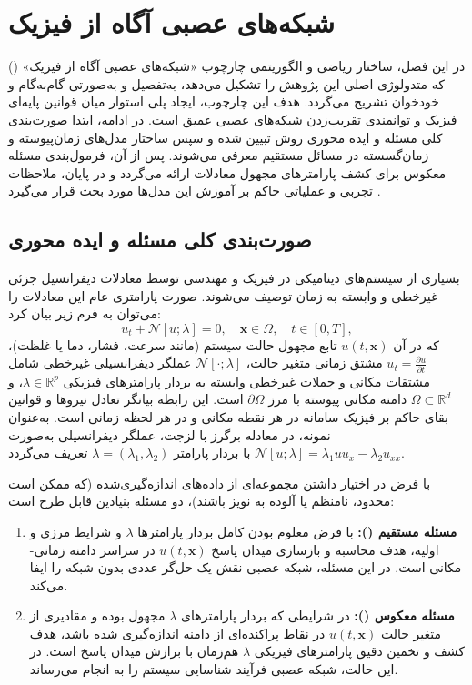 \chapter{شبکه‌های عصبی آگاه از فیزیک}
\label{ch:method}

در این فصل، ساختار ریاضی و الگوریتمی چارچوب «شبکه‌های عصبی آگاه از فیزیک» () که متدولوژی اصلی این پژوهش را تشکیل می‌دهد، به‌تفصیل و به‌صورتی گام‌به‌گام و خودخوان تشریح می‌گردد. هدف این چارچوب، ایجاد پلی استوار میان قوانین پایه‌ای فیزیک و توانمندی تقریب‌زدن شبکه‌های عصبی عمیق است. در ادامه، ابتدا صورت‌بندی کلی مسئله و ایده محوری روش تبیین شده و سپس ساختار مدل‌های زمان‌پیوسته و زمان‌گسسته در مسائل مستقیم معرفی می‌شوند. پس از آن، فرمول‌بندی مسئله معکوس برای کشف پارامترهای مجهول معادلات ارائه می‌گردد و در پایان، ملاحظات تجربی و عملیاتی حاکم بر آموزش این مدل‌ها مورد بحث قرار می‌گیرد \cite{raissi2019}.

\section{صورت‌بندی کلی مسئله و ایده محوری}
\label{sec:formulation}

بسیاری از سیستم‌های دینامیکی در فیزیک و مهندسی توسط معادلات دیفرانسیل جزئی غیرخطی و وابسته به زمان توصیف می‌شوند. صورت پارامتری عام این معادلات را می‌توان به فرم زیر بیان کرد:
\begin{equation}
u_t + \mathcal{N}[u; \lambda] = 0, \quad \mathbf{x} \in \Omega, \quad t \in [0,T],
\label{eq:general-pde}
\end{equation}
که در آن $u(t,\mathbf{x})$ تابع مجهول حالت سیستم (مانند سرعت، فشار، دما یا غلظت)، $u_t = \frac{\partial u}{\partial t}$ مشتق زمانی متغیر حالت، $\mathcal{N}[\cdot; \lambda]$ عملگر دیفرانسیلی غیرخطی شامل مشتقات مکانی و جملات غیرخطی وابسته به بردار پارامترهای فیزیکی $\lambda \in \mathbb{R}^p$، و $\Omega \subset \mathbb{R}^d$ دامنه مکانی پیوسته با مرز $\partial\Omega$ است. این رابطه بیانگر تعادل نیروها و قوانین بقای حاکم بر فیزیک سامانه در هر نقطه مکانی و در هر لحظه زمانی است. به‌عنوان نمونه، در معادله برگرز با لزجت، عملگر دیفرانسیلی به‌صورت $\mathcal{N}[u;\lambda] = \lambda_1 u u_x - \lambda_2 u_{xx}$ با بردار پارامتر $\lambda = (\lambda_1, \lambda_2)$ تعریف می‌گردد.

با فرض در اختیار داشتن مجموعه‌ای از داده‌های اندازه‌گیری‌شده (که ممکن است محدود، نامنظم یا آلوده به نویز باشند)، دو مسئله بنیادین قابل طرح است:
\begin{enumerate}
\item \textbf{مسئله مستقیم ():} با فرض معلوم بودن کامل بردار پارامترها $\lambda$ و شرایط مرزی و اولیه، هدف محاسبه و بازسازی میدان پاسخ $u(t,\mathbf{x})$ در سراسر دامنه زمانی-مکانی است. در این مسئله، شبکه عصبی نقش یک حل‌گر عددی بدون شبکه را ایفا می‌کند.
\item \textbf{مسئله معکوس ():} در شرایطی که بردار پارامترهای $\lambda$ مجهول بوده و مقادیری از متغیر حالت $u(t,\mathbf{x})$ در نقاط پراکنده‌ای از دامنه اندازه‌گیری شده باشد، هدف کشف و تخمین دقیق پارامترهای فیزیکی $\lambda$ هم‌زمان با برازش میدان پاسخ است. در این حالت، شبکه عصبی فرآیند شناسایی سیستم را به انجام می‌رساند.
\end{enumerate}

